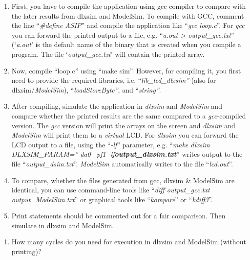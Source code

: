 \documentclass[
]{article}
\begin{document}
\begin{enumerate}
  \begin{enumerate}
  \def\labelenumii{\arabic{enumii}.}
  \item
    First, you have to compile the application using gcc compiler to
    compare with the later results from dlxsim and ModelSim. To compile
    with GCC, comment the line ``\emph{\#define ASIP}'' and compile the
    application like ``\emph{gcc loop.c}''. For \emph{gcc} you can
    forward the printed output to a file, e.g. ``\emph{a.out
    \textgreater{} output\_gcc.txt}'' (`\emph{a.out}' is the default
    name of the binary that is created when you compile a program. The
    file `\emph{output\_gcc.txt}' will contain the printed array.
  \item
    Now, compile ``loop.c'' using ``make sim''. However, for compiling
    it, you first need to provide the required libraries, i.e.
    ``\emph{lib\_lcd\_dlxsim''} (also for dlxsim/\emph{ModelSim}),
    ``\emph{loadStoreByte''}, and ``\emph{string''}.
  \item
    After compiling, simulate the application in \emph{dlxsim} and
    \emph{ModelSim} and compare whether the printed results are the same
    compared to a \emph{gcc}-compiled version. The \emph{gcc} version
    will print the arrays on the screen and \emph{dlxsim} and
    \emph{ModelSim} will print them to a \emph{virtual} LCD. For
    \emph{dlxsim} you can forward the LCD output to a file, using the
    ``\emph{-lf}'' parameter, e.g. ``\emph{make dlxsim
    DLXSIM\_PARAM=''-da0 --pf1 -lf\textbf{output\_dlxsim.txt}}'' writes
    output to the file ``\emph{output\_dsim.txt}''. \emph{ModelSim}
    automatically writes to the file ``\emph{lcd.out}''.
  \item
    To compare, whether the files generated from gcc, dlxsim \& ModelSim
    are identical, you can use command-line tools like ``\emph{diff
    output\_gcc.txt output\_ModelSim.txt}'' or graphical tools like
    ``\emph{kompare}'' or ``\emph{kdiff3}''.
  \item
    Print statements should be commented out for a fair comparison. Then
    simulate in dlxsim and ModelSim.
  \end{enumerate}
\end{enumerate}

\begin{enumerate}
\def\labelenumi{\alph{enumi})}
\item
  How many cycles do you need for execution in dlxsim and ModelSim
  (without printing)?
\end{enumerate}
\end{document}
